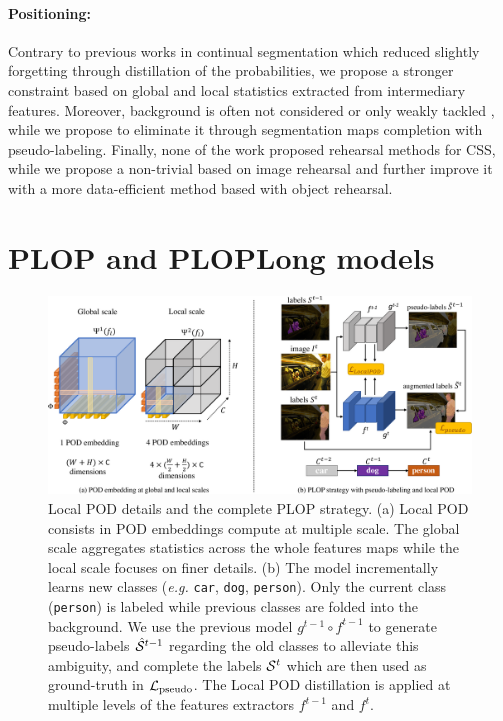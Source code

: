 \paragraph{Positioning:\,} Contrary to previous works in continual segmentation
\citep{michieli2019ilt,cermelli2020modelingthebackground} which reduced slightly forgetting through
distillation of the probabilities, we propose a stronger constraint based on global and local
statistics extracted from intermediary features. Moreover, background is often not considered
\citep{michieli2019ilt} or only weakly tackled \citep{cermelli2020modelingthebackground}, while we
propose to eliminate it through segmentation maps completion with pseudo-labeling. Finally, none of
the work proposed rehearsal methods for \ac{CSS}, while we propose a non-trivial based on image rehearsal
and further improve it with a more data-efficient method based with object rehearsal.


\section{PLOP and PLOPLong models}
\label{sec:seg_plop}

\begin{figure}
    \centering
    \includegraphics[width=\linewidth]{images/seg/plop_strategy.pdf}
    \caption{Local POD details and the complete PLOP strategy. (a) Local POD consists in POD
        embeddings compute at multiple scale. The global scale aggregates statistics across the
        whole features maps while the local scale focuses on finer details.  (b) The model
        incrementally learns new classes (\textit{e.g.} \texttt{car}, \texttt{dog},
        \texttt{person}). Only the current class (\texttt{person}) is labeled while previous classes
        are folded into the background. We use the previous model $g^{t-1} \circ f^{t-1}$ to
        generate pseudo-labels $\hat{\mathcal{S}}^{t-1}$ regarding the old classes to alleviate this
        ambiguity, and complete the labels $\mathcal{S}^t$ which are then used as ground-truth in
        $\mathcal{L}_\text{pseudo}$. The Local POD distillation is applied at multiple levels of the
        features extractors $f^{t-1}$ and $f^t$.}
    \label{fig:seg_model_plop}
\end{figure}

